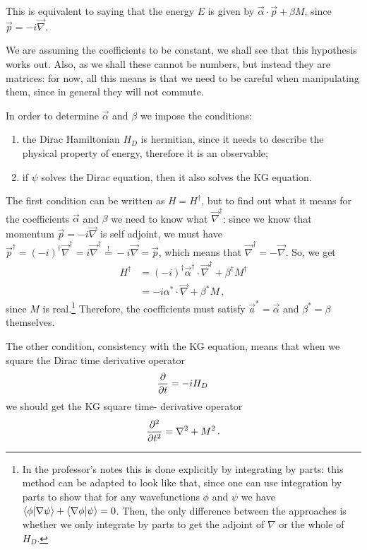 \documentclass[main.tex]{subfiles}
\begin{document}
This is equivalent to saying that the energy \(E\) is given by \(\vec{\alpha} \cdot \vec{p} + \beta M\), since \(\vec{p} = - i \vec{\nabla}\). 

We are assuming the coefficients to be constant, we shall see that this hypothesis works out. Also, as we shall these cannot be numbers, but instead they are matrices: for now, all this means is that we need to be careful when manipulating them, since in general they will not commute. 

In order to determine \(\vec{\alpha }\) and \(\beta \) we impose the conditions: 
\begin{enumerate}
  \item the Dirac Hamiltonian \(H_D\) is hermitian, since it needs to describe the physical property of energy, therefore it is an observable;
  \item if \(\psi \) solves the Dirac equation, then it also solves the KG equation. 
\end{enumerate}


The first condition can be written as \(H = H ^\dag\), but to find out what it means for the coefficients \(\vec{\alpha }\) and \(\beta \) we need to know what \(\vec{\nabla} ^\dag\): since we know that momentum \(\vec{p} = -i \vec{\nabla}\) is self adjoint, we must have \(\vec{p} ^\dag = (-i) ^\dag \vec{\nabla} ^\dag = i \vec{\nabla} ^\dag \overset{!}{=} -i \vec{\nabla} = \vec{p} \),
which means that \(\vec{\nabla} ^\dag = - \vec{\nabla}\).
So, we get 
%
\begin{align}
H ^\dag &= (-i) ^\dag \vec{\alpha} ^\dag \cdot \vec{\nabla} ^\dag + \beta ^\dag M ^\dag  \\
&= -i \alpha^{*} \cdot \vec{\nabla} + \beta^{*} M
\,,
\end{align}
%
since \(M\) is real.\footnote{In the professor's notes this is done explicitly by integrating by parts: this method can be adapted to look like that, since one can use integration by parts to show that for any wavefunctions \(\phi \) and \(\psi \) we have \(\braket{\phi }{\nabla \psi } + \braket{\nabla \phi}{\psi } = 0\). Then, the only difference between the approaches is whether we only integrate by parts to get the adjoint of \(\nabla\) or the whole of \(H_D\). }
Therefore, the coefficients must satisfy \(\vec{a}^{*} = \vec{\alpha}\) and \(\beta^{*} = \beta \) themselves. 

The other condition, consistency with the KG equation, means that when we square the Dirac time derivative operator 
%
\begin{align}
\pdv{}{t} = -i H_D
\,
\end{align}
%
we should get the KG square time- derivative operator 
%
\begin{align}
\pdv[2]{}{t} = \nabla^2 + M^2
\,.
\end{align}
\end{document}
